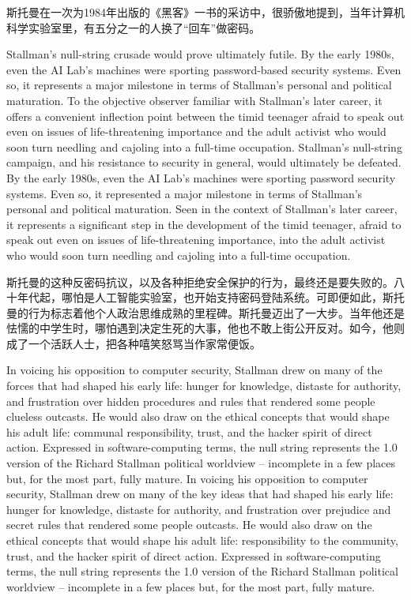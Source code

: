 \ifdefined\chs
斯托曼在一次为1984年出版的《黑客》一书的采访中，很骄傲地提到，当年计算机科学实验室里，有五分之一的人换了``回车''做密码。
\fi
\fi

\ifdefined\eng
\ifdefined\vone
Stallman's null-string crusade would prove ultimately futile. By the early 1980s, even the AI Lab's machines were sporting password-based security systems. Even so, it represents a major milestone in terms of Stallman's personal and political maturation. To the objective observer familiar with Stallman's later career, it offers a convenient inflection point between the timid teenager afraid to speak out even on issues of life-threatening importance and the adult activist who would soon turn needling and cajoling into a full-time occupation.
\fi
\ifdefined\vtwo
Stallman's null-string campaign, and his resistance to security in general, would ultimately be defeated. By the early 1980s, even the AI Lab's machines were sporting password security systems. Even so, it represented a major milestone in terms of Stallman's personal and political maturation. Seen in the context of Stallman's later career, it represents a significant step in the development of the timid teenager, afraid to speak out even on issues of life-threatening importance, into the adult activist who would soon turn needling and cajoling into a full-time occupation.
\fi
\fi

\ifdefined\chs
斯托曼的这种反密码抗议，以及各种拒绝安全保护的行为，最终还是要失败的。八十年代起，哪怕是人工智能实验室，也开始支持密码登陆系统。可即便如此，斯托曼的行为标志着他个人政治思维成熟的里程碑。斯托曼迈出了一大步。当年他还是怯懦的中学生时，哪怕遇到决定生死的大事，他也不敢上街公开反对。如今，他则成了一个活跃人士，把各种嘻笑怒骂当作家常便饭。
\fi

\ifdefined\eng
\ifdefined\vone
In voicing his opposition to computer security, Stallman drew on many of the forces that had shaped his early life: hunger for knowledge, distaste for authority, and frustration over hidden procedures and rules that rendered some people clueless outcasts. He would also draw on the ethical concepts that would shape his adult life: communal responsibility, trust, and the hacker spirit of direct action. Expressed in software-computing terms, the null string represents the 1.0 version of the Richard Stallman political worldview -- incomplete in a few places but, for the most part, fully mature.
\fi
\ifdefined\vtwo
In voicing his opposition to computer security, Stallman drew on many of the key ideas that had shaped his early life: hunger for knowledge, distaste for authority, and frustration over prejudice and secret rules that rendered some people outcasts. He would also draw on the ethical concepts that would shape his adult life: responsibility to the community, trust, and the hacker spirit of direct action. Expressed in software-computing terms, the null string represents the 1.0 version of the Richard Stallman political worldview -- incomplete in a few places but, for the most part, fully mature.
\fi
\fi

